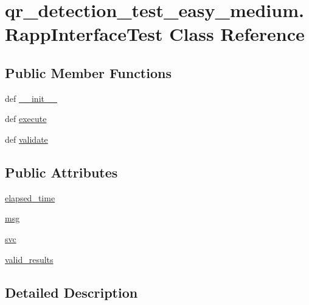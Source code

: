\hypertarget{classqr__detection__test__easy__medium_1_1RappInterfaceTest}{\section{qr\-\_\-detection\-\_\-test\-\_\-easy\-\_\-medium.\-Rapp\-Interface\-Test Class Reference}
\label{classqr__detection__test__easy__medium_1_1RappInterfaceTest}
}
\subsection*{Public Member Functions}
\begin{DoxyCompactItemize}
\item 
def \hyperlink{classqr__detection__test__easy__medium_1_1RappInterfaceTest_aa71eda97f8ec5b006a7abe454f09ebec}{\-\_\-\-\_\-init\-\_\-\-\_\-}
\item 
def \hyperlink{classqr__detection__test__easy__medium_1_1RappInterfaceTest_aac3034fb8d93ede7f54ae9f7d01c438a}{execute}
\item 
def \hyperlink{classqr__detection__test__easy__medium_1_1RappInterfaceTest_abea1d8bae842b3ce3574af18d8c4b4b8}{validate}
\end{DoxyCompactItemize}
\subsection*{Public Attributes}
\begin{DoxyCompactItemize}
\item 
\hyperlink{classqr__detection__test__easy__medium_1_1RappInterfaceTest_a4ac4450b97de36b77ac3efec90f8543e}{elapsed\-\_\-time}
\item 
\hyperlink{classqr__detection__test__easy__medium_1_1RappInterfaceTest_a04c7e2a44edded440537627c6c49ca52}{msg}
\item 
\hyperlink{classqr__detection__test__easy__medium_1_1RappInterfaceTest_ade5e67316cf22234d40e1cab43e65a76}{svc}
\item 
\hyperlink{classqr__detection__test__easy__medium_1_1RappInterfaceTest_a713cf42e02e18a8ffedc6be5bd82affb}{valid\-\_\-results}
\end{DoxyCompactItemize}


\subsection{Detailed Description}



